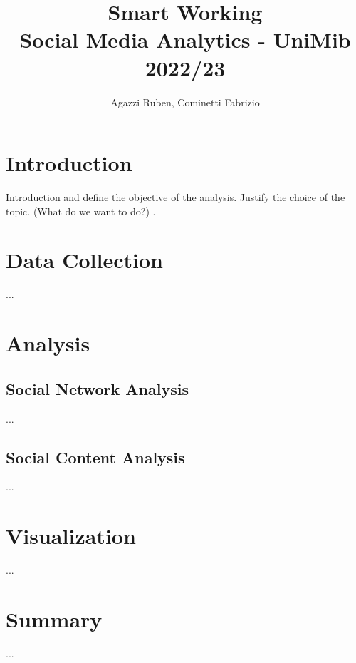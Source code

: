 \documentclass[12pt,journal,compsoc]{IEEEtran}
\begin{document}
\title{Smart Working\\\normalsize{Social Media Analytics - UniMib 2022/23}}
\author{Agazzi Ruben, Cominetti Fabrizio}


\maketitle
\IEEEpeerreviewmaketitle
\IEEEdisplaynontitleabstractindextext

\tableofcontents


\section{Introduction}
 Introduction and define the objective of the analysis. Justify the choice of the topic. (What do we want to do?) .

\section{Data Collection}
...

\section{Analysis}
\subsection{Social Network Analysis}
...

\subsection{Social Content Analysis}
...

\section{Visualization}
...

\section{Summary}
...

\end{document}
